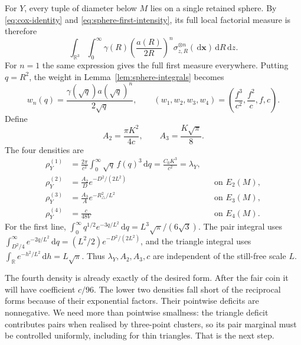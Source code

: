 \documentclass[11pt,a4paper]{article}
\numberwithin{equation}{section}
\theoremstyle{definition}
\theoremstyle{remark}
\newcommand{\R}{\mathbb R}
\newcommand{\dd}{\,\mathrm d}
\begin{document}
For $Y$, every tuple of diameter below $M$ lies on a single retained
sphere. By \eqref{eq:cox-identity} and
\eqref{eq:sphere-first-intensity}, its full local factorial measure is
therefore
\begin{equation}
 \int_{\R^3}\int_0^\infty
 \gamma(R)\left(\frac{a(R)}{2R}\right)^n
       \sigma_{z,R}^{\otimes n}(\dd\mathbf x)\dd R\dd z.
 \label{eq:local-sphere-measure}
\end{equation}
For $n=1$ the same expression gives the full first measure everywhere.
Putting $q=R^2$, the weight in Lemma~\ref{lem:sphere-integrals} becomes
\begin{equation}
 w_n(q)=\frac{\gamma(\sqrt q)a(\sqrt q)^n}{2\sqrt q},
 \qquad (w_1,w_2,w_3,w_4)=\left(\frac{f^3}{c^2},\frac{f^2}{c},f,c\right).
 \label{eq:wn}
\end{equation}
Define
\begin{equation}
 A_2=\frac{\pi K^2}{4c},\qquad A_3=\frac{K\sqrt\pi}{8}.
 \label{eq:A2A3}
\end{equation}
The four densities are
\begin{align}
 \rho_Y^{(1)}&=\frac{2\pi}{c^2}\int_0^\infty\sqrt q\,f(q)^3\dd q
              =\frac{C_0K^3}{c^2}=\lambda_Y,
              \label{eq:Y1}\\
 \rho_Y^{(2)}&=\frac{A_2}{D}e^{-D^2/(2L^2)}
                         &&\text{on }E_2(M),\label{eq:Y2}\\
 \rho_Y^{(3)}&=\frac{A_3}{A}e^{-R_\triangle^2/L^2}
                         &&\text{on }E_3(M),\label{eq:Y3}\\
 \rho_Y^{(4)}&=\frac{c}{48V}
                         &&\text{on }E_4(M).\label{eq:Y4}
\end{align}
For the first line,
$\int_0^\infty q^{1/2}e^{-3q/L^2}\dd q
=L^3\sqrt\pi/(6\sqrt3)$. The pair integral uses
$\int_{D^2/4}^\infty e^{-2q/L^2}\dd q
=(L^2/2)e^{-D^2/(2L^2)}$, and the triangle integral uses
$\int_\R e^{-h^2/L^2}\dd h=L\sqrt\pi$.
Thus $\lambda_Y,A_2,A_3,c$ are independent of the still-free scale $L$.

The fourth density is already exactly of the desired form. After the
fair coin it will have coefficient $c/96$. The lower two densities fall
short of the reciprocal forms because of their exponential factors.
Their pointwise deficits are nonnegative. We need more than pointwise
smallness: the triangle deficit contributes pairs when realised by
three-point clusters, so its pair marginal must be controlled uniformly,
including for thin triangles. That is the next step.
\end{document}
